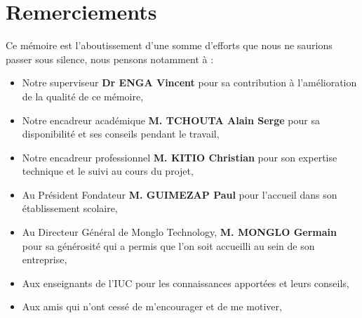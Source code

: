 \chapter*{Remerciements}         %

Ce mémoire est l'aboutissement d'une somme d'efforts que nous ne saurions passer sous silence, nous pensons notamment à :

\begin{itemize}
    \item Notre superviseur \textbf{Dr ENGA Vincent} pour sa contribution à l'amélioration de la qualité de ce mémoire,
    \item Notre encadreur académique  \textbf{M. TCHOUTA Alain Serge} pour sa disponibilité et ses conseils pendant le travail,
    \item  Notre encadreur professionnel \textbf{M. KITIO Christian} pour son expertise technique et le suivi au cours du projet,
    \item Au Président Fondateur \textbf{M. GUIMEZAP Paul} pour l’accueil dans son établissement scolaire,
    \item Au Directeur Général de Monglo Technology, \textbf{M. MONGLO Germain} pour sa générosité qui a permis que l'on soit accueilli au sein de son entreprise,
    \item Aux enseignants de l’IUC pour les connaissances apportées et leurs conseils,
    \item Aux amis qui n’ont cessé de m’encourager et de me motiver,
\end{itemize}